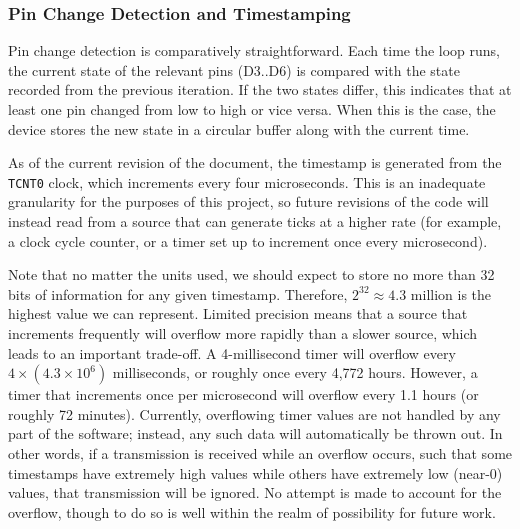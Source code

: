 \documentclass[12pt]{article}
\begin{document}
%
%
%

\subsubsection{Pin Change Detection and Timestamping}

Pin change detection is comparatively straightforward.
Each time the loop runs, the current state of the relevant pins (D3..D6) is
compared with the state recorded from the previous iteration.
If the two states differ, this indicates that at least one pin changed from
low to high or vice versa.
When this is the case, the device stores the new state in a circular
buffer along with the current time.

As of the current revision of the document, the timestamp is generated from
the \texttt{TCNT0} clock, which increments every four microseconds.
This is an inadequate granularity for the purposes of this project, so future
revisions of the code will instead read from a source that can generate ticks
at a higher rate (for example, a clock cycle counter, or a timer set up to
increment once every microsecond).

Note that no matter the units used, we should expect to store no more than 32
bits of information for any given timestamp.
Therefore, $2^{32} \approx 4.3$ million is the highest value we can represent.
Limited precision means that a source that increments frequently will overflow
more rapidly than a slower source, which leads to an important trade-off.
A 4-millisecond timer will overflow every $4\times (4.3\times 10^6)$
milliseconds, or roughly once every 4,772 hours.
However, a timer that increments once per microsecond will overflow every 1.1
hours (or roughly 72 minutes).
Currently, overflowing timer values are not handled by any part of the
software; instead, any such data will automatically be thrown out.
In other words, if a transmission is received while an overflow occurs, such
that some timestamps have extremely high values while others have extremely
low (near-0) values, that transmission will be ignored.
No attempt is made to account for the overflow, though to do so is well within
the realm of possibility for future work.
\end{document}

